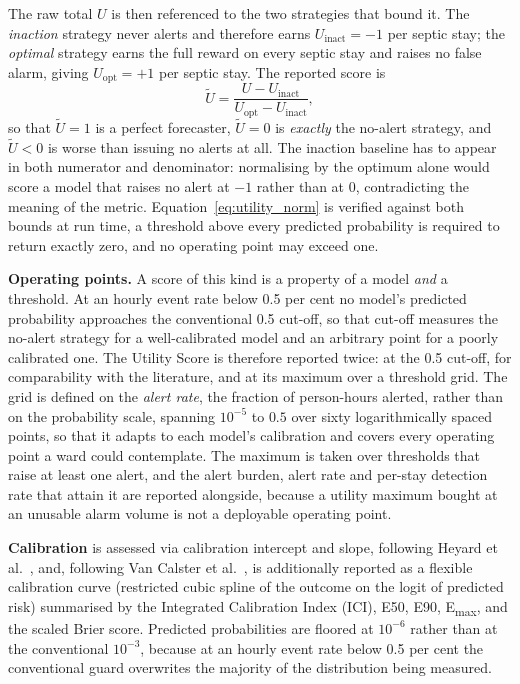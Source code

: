 The raw total $U$ is then referenced to the two strategies that bound it. The
\emph{inaction} strategy never alerts and therefore earns $U_{\text{inact}} =
-1$ per septic stay; the \emph{optimal} strategy earns the full reward on every
septic stay and raises no false alarm, giving $U_{\text{opt}} = +1$ per septic
stay. The reported score is
\begin{equation}
    \widetilde{U} = \frac{U - U_{\text{inact}}}
                         {U_{\text{opt}} - U_{\text{inact}}},
    \label{eq:utility_norm}
\end{equation}
so that $\widetilde{U} = 1$ is a perfect forecaster, $\widetilde{U} = 0$ is
\emph{exactly} the no-alert strategy, and $\widetilde{U} < 0$ is worse than
issuing no alerts at all. The inaction baseline has to appear in both numerator
and denominator: normalising by the optimum alone would score a model that
raises no alert at $-1$ rather than at $0$, contradicting the meaning of the
metric. Equation~\eqref{eq:utility_norm} is verified against both bounds at run
time, a threshold above every predicted probability is required to return
exactly zero, and no operating point may exceed one.

\textbf{Operating points.} A score of this kind is a property of a model
\emph{and} a threshold. At an hourly event rate below 0.5 per cent no model's
predicted probability approaches the conventional 0.5 cut-off, so that cut-off
measures the no-alert strategy for a well-calibrated model and an arbitrary
point for a poorly calibrated one. The Utility Score is therefore reported
twice: at the 0.5 cut-off, for comparability with the literature, and at its
maximum over a threshold grid. The grid is defined on the \emph{alert rate}, the fraction of person-hours alerted, rather than on the probability scale,
spanning $10^{-5}$ to $0.5$ over sixty logarithmically spaced points, so that
it adapts to each model's calibration and covers every operating point a ward
could contemplate. The maximum is taken over thresholds that raise at least one
alert, and the alert burden, alert rate and per-stay detection rate that attain
it are reported alongside, because a utility maximum bought at an unusable
alarm volume is not a deployable operating point.

\textbf{Calibration} is assessed via calibration intercept and slope, following
Heyard et al.\ \cite{heyard2020evaluation}, and, following Van Calster et al.\
\cite{vancalster2019calibration}, is additionally reported as a flexible
calibration curve (restricted cubic spline of the outcome on the logit of
predicted risk) summarised by the Integrated Calibration Index (ICI), E50, E90,
E\textsubscript{max}, and the scaled Brier score. Predicted probabilities are
floored at $10^{-6}$ rather than at the conventional $10^{-3}$, because at an
hourly event rate below 0.5 per cent the conventional guard overwrites the
majority of the distribution being measured.

